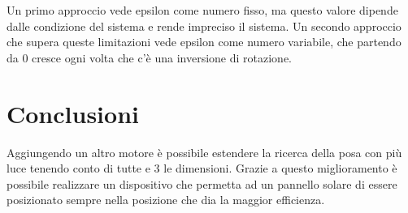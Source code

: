 \documentclass[12pt,oneside,a4paper]{article}
\begin{document}
Un primo approccio vede epsilon come numero fisso, ma questo valore dipende dalle condizione del sistema e rende impreciso il sistema. 
Un secondo approccio che supera queste limitazioni vede epsilon come numero variabile, che partendo da 0 cresce ogni volta che c'è una inversione di rotazione.


\section{Conclusioni}
Aggiungendo un altro motore è possibile estendere la ricerca della posa con più luce tenendo conto di tutte e 3 le dimensioni.
Grazie a questo miglioramento è possibile realizzare un dispositivo che permetta ad un pannello solare di essere posizionato sempre nella posizione che dia la maggior efficienza.




\end{document}
